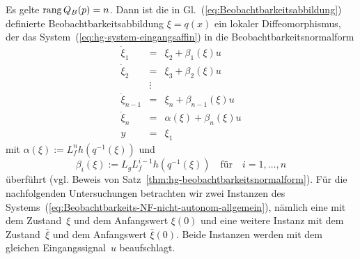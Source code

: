 \begin{svmultproof2}
Es gelte ${\operatorname{rang}}\,Q_{B}(p)=n$. Dann ist die in Gl.~(\ref{eq:Beobachtbarkeitsabbildung})
definierte Beobachtbarkeitsabbildung $\xi=q(x)$ ein lokaler Diffeomorphismus,
der das System~(\ref{eq:hg-system-eingangsaffin}) in die Beobachtbarkeitsnormalform
\begin{equation}
\begin{array}{lcl}
\dot{\xi}_{1} & = & \xi_{2}+\beta_{1}(\xi)u\\
\dot{\xi}_{2} & = & \xi_{3}+\beta_{2}(\xi)u\\
 & \vdots\\
\dot{\xi}_{n-1} & = & \xi_{n}+\beta_{n-1}(\xi)u\\
\dot{\xi}_{n} & = & \alpha(\xi)+\beta_{n}(\xi)u\\
y & = & \xi_{1}
\end{array}\label{eq:Beobachtbarkeits-NF-nicht-autonom-allgemein}
\end{equation}
mit $\alpha(\xi):=L_{f}^{n}h(q^{-1}(\xi))$ und 
\begin{equation}
\beta_{i}(\xi):=L_{g}L_{f}^{i-1}h(q^{-1}(\xi))\quad\text{für}\quad i=1,\ldots,n\label{eq:beobachtbarkeits-NF-beta-i}
\end{equation}
überführt (vgl. Beweis von Satz~\ref{thm:hg-beobachtbarkeitsnormalform}).
Für die nachfolgenden Untersuchungen betrachten wir zwei Instanzen
des Systems~(\ref{eq:Beobachtbarkeits-NF-nicht-autonom-allgemein}),
nämlich eine mit dem Zustand~$\xi$ und dem Anfangswert $\xi(0)$
und eine weitere Instanz mit dem Zustand~$\bar{\xi}$ und dem Anfangswert
$\bar{\xi}(0)$. Beide Instanzen werden mit dem gleichen Eingangssignal~$u$
beaufschlagt.


\end{svmultproof2}
